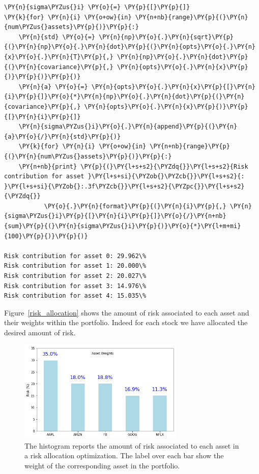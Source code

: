 \begin{tcolorbox}[breakable, size=fbox, boxrule=1pt, pad at break*=1mm,colback=cellbackground, colframe=cellborder]
\begin{Verbatim}[commandchars=\\\{\}]
\PY{n}{sigma\PYZus{}i} \PY{o}{=} \PY{p}{[}\PY{p}{]}
\PY{k}{for} \PY{n}{i} \PY{o+ow}{in} \PY{n+nb}{range}\PY{p}{(}\PY{n}{num\PYZus{}assets}\PY{p}{)}\PY{p}{:}
    \PY{n}{std} \PY{o}{=} \PY{n}{np}\PY{o}{.}\PY{n}{sqrt}\PY{p}{(}\PY{n}{np}\PY{o}{.}\PY{n}{dot}\PY{p}{(}\PY{n}{opts}\PY{o}{.}\PY{n}{x}\PY{o}{.}\PY{n}{T}\PY{p}{,} \PY{n}{np}\PY{o}{.}\PY{n}{dot}\PY{p}{(}\PY{n}{covariance}\PY{p}{,} \PY{n}{opts}\PY{o}{.}\PY{n}{x}\PY{p}{)}\PY{p}{)}\PY{p}{)} 
    \PY{n}{a} \PY{o}{=} \PY{n}{opts}\PY{o}{.}\PY{n}{x}\PY{p}{[}\PY{n}{i}\PY{p}{]}\PY{o}{*}\PY{n}{np}\PY{o}{.}\PY{n}{dot}\PY{p}{(}\PY{n}{covariance}\PY{p}{,} \PY{n}{opts}\PY{o}{.}\PY{n}{x}\PY{p}{)}\PY{p}{[}\PY{n}{i}\PY{p}{]} 
	\PY{n}{sigma\PYZus{}i}\PY{o}{.}\PY{n}{append}\PY{p}{(}\PY{n}{a}\PY{o}{/}\PY{n}{std}\PY{p}{)}
	\PY{k}{for} \PY{n}{i} \PY{o+ow}{in} \PY{n+nb}{range}\PY{p}{(}\PY{n}{num\PYZus{}assets}\PY{p}{)}\PY{p}{:}
    \PY{n+nb}{print} \PY{p}{(}\PY{l+s+s2}{\PYZdq{}}\PY{l+s+s2}{Risk contribution for asset }\PY{l+s+si}{\PYZob{}\PYZcb{}}\PY{l+s+s2}{: }\PY{l+s+si}{\PYZob{}:.3f\PYZcb{}}\PY{l+s+s2}{\PYZpc{}}\PY{l+s+s2}{\PYZdq{}}
           \PY{o}{.}\PY{n}{format}\PY{p}{(}\PY{n}{i}\PY{p}{,} \PY{n}{sigma\PYZus{}i}\PY{p}{[}\PY{n}{i}\PY{p}{]}\PY{o}{/}\PY{n+nb}{sum}\PY{p}{(}\PY{n}{sigma\PYZus{}i}\PY{p}{)}\PY{o}{*}\PY{l+m+mi}{100}\PY{p}{)}\PY{p}{)}

Risk contribution for asset 0: 29.962\%
Risk contribution for asset 1: 20.000\%
Risk contribution for asset 2: 20.027\%
Risk contribution for asset 3: 14.976\%
Risk contribution for asset 4: 15.035\%
\end{Verbatim}
\end{tcolorbox}
Figure~\ref{risk_allocation} shows the amount of risk associated to each asset and their weights within the portfolio. Indeed for each stock we have allocated the desired amount of risk.

\begin{figure}[htb]
	\centering
	\includegraphics[width=0.7\textwidth]{figures/risk_allocation.png}
	\caption{The histogram reports the amount of risk associated to each asset in a risk allocation optimization. The label over each bar show the weight of the corresponding asset in the portfolio.}
	\label{fig:risk_allocation}
\end{figure}

